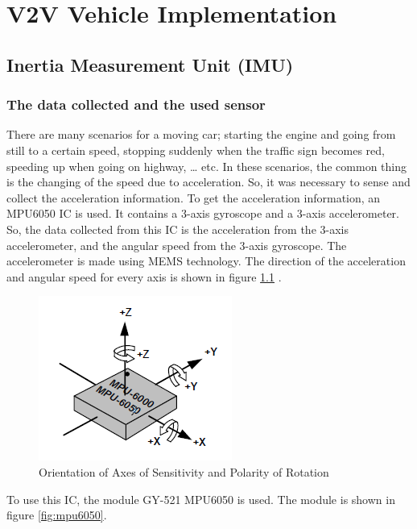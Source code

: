 \chapter{V2V Vehicle Implementation}

\section{Inertia Measurement Unit (IMU)}
\subsection{The data collected and the used sensor}
There are many scenarios for a moving car; starting the engine and going from still to a certain speed, stopping suddenly when the traffic sign becomes red, speeding up when going on highway, … etc. In these scenarios, the common thing is the changing of the speed due to acceleration. So, it was necessary to sense and collect the acceleration information.
To get the acceleration information, an MPU6050  IC is used. It contains a 3-axis gyroscope and a 3-axis accelerometer. So, the data collected from this IC is the acceleration from the 3-axis accelerometer, and the angular speed from the 3-axis gyroscope. The accelerometer is made using MEMS technology. The direction of the acceleration and angular speed for every axis is shown in figure \ref{fig:orientation} .
\begin{figure}[h]
    \centering
    \includegraphics{figure/5-1.png}
    \caption{Orientation of Axes of Sensitivity and Polarity of Rotation}
    \label{fig:orientation}
\end{figure}
\clearpage
To use this IC, the module GY-521 MPU6050 is used. The module is shown in figure \ref{fig:mpu6050}.

